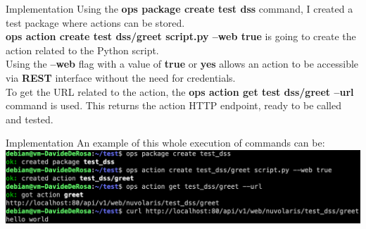\documentclass[aspectratio=169]{beamer}
\begin{document}
\begin{frame}{Implementation}
Using the \textbf{ops package create test dss} command, I created a test package where actions can be stored.\vspace{14pt}\\
\textbf{ops action create test dss/greet script.py –web true} is going to create the action related to the Python script.\\
Using the \textbf{–web} flag with a value of \textbf{true} or \textbf{yes} allows an action to be accessible via \textbf{REST} interface without the need for credentials.\vspace{14pt}\\
To get the URL related to the action, the \textbf{ops action get test dss/greet –url} command is used. This returns the action HTTP endpoint, ready to be called and tested.
\end{frame}

\begin{frame}{Implementation}
An example of this whole execution of commands can be:\vspace{14pt}\\
\centering
\includegraphics[width=1\textwidth]{img/demo.png}
\end{frame}
\end{document}
